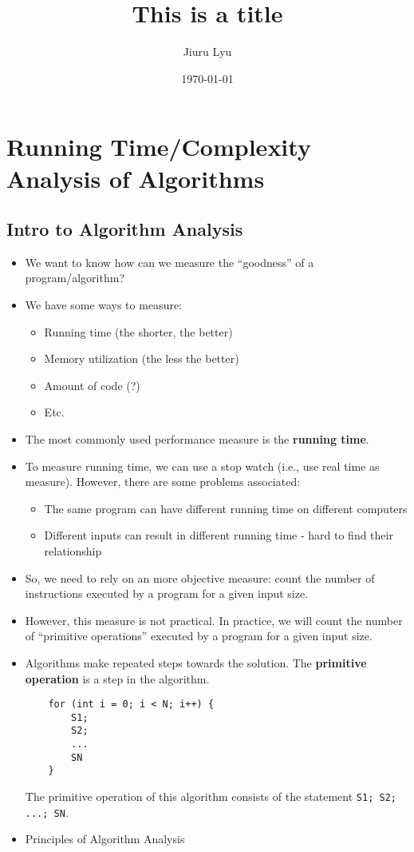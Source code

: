 \documentclass[12pt, a4paper]{article}
\title{\textbf{This is a title}}
\author{Jiuru Lyu}
\date{\today}
\begin{document}
\section*{Running Time/Complexity Analysis of Algorithms}
\subsection*{Intro to Algorithm Analysis}
\begin{itemize}
	\item We want to know how can we measure the ``goodness'' of a program/algorithm?
	\item We have some ways to measure:
	\begin{itemize}
		\item Running time (the shorter, the better)
		\item Memory utilization (the less the better)
		\item Amount of code (?)
		\item Etc.
	\end{itemize}
	\item The most commonly used performance measure is the \textbf{running time}.
	\item To measure running time, we can use a stop watch (i.e., use real time as measure). However, there are some problems associated: 
	\begin{itemize}
		\item The same program can have different running time on different computers
		\item Different inputs can result in different running time - hard to find their relationship
	\end{itemize}
	\item So, we need to rely on an more objective measure: count the number of instructions executed by a program for a given input size. 
	\item However, this measure is not practical. In practice, we will count the number of ``primitive operations'' executed by a program for a given input size. 
	\item Algorithms make repeated steps towards the solution. The \textbf{primitive operation} is a step in the algorithm. 
\begin{lstlisting}
	for (int i = 0; i < N; i++) {
		S1;
		S2;
		...
		SN
	}
\end{lstlisting}
The primitive operation of this algorithm consists of the statement \texttt{S1; S2; ...; SN}. 
	\item Principles of Algorithm Analysis

\end{itemize}
\end{document}
